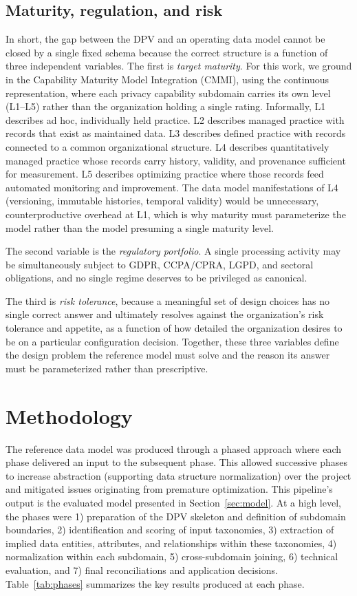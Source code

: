 \documentclass[10pt,letterpaper,twocolumn,twoside]{rho-class/rho}
\begin{document}
\subsection{Maturity, regulation, and risk}\label{sec:axes}

In short, the gap between the DPV and an operating data model cannot be closed by a single fixed schema because the correct structure is a function of three independent variables. The first is \emph{target maturity}. For this work, we ground in the Capability Maturity Model Integration (CMMI)\cite{cmmiinstitute}, using the continuous representation, where each privacy capability subdomain carries its own level (L1--L5) rather than the organization holding a single rating. Informally, L1 describes ad hoc, individually held practice. L2 describes managed practice with records that exist as maintained data. L3 describes defined practice with records connected to a common organizational structure. L4 describes quantitatively managed practice whose records carry history, validity, and provenance sufficient for measurement. L5 describes optimizing practice where those records feed automated monitoring and improvement. The data model manifestations of L4 (versioning, immutable histories, temporal validity) would be unnecessary, counterproductive overhead at L1, which is why maturity must parameterize the model rather than the model presuming a single maturity level.

The second variable is the \emph{regulatory portfolio}. A single processing activity may be simultaneously subject to GDPR, CCPA/CPRA, LGPD, and sectoral obligations, and no single regime deserves to be privileged as canonical. 

The third is \emph{risk tolerance}, because a meaningful set of design choices has no single correct answer and ultimately resolves against the organization's risk tolerance and appetite, as a function of how detailed the organization desires to be on a particular configuration decision. Together, these three variables define the design problem the reference model must solve and the reason its answer must be parameterized rather than prescriptive.

\section{Methodology}\label{sec:method}

The reference data model was produced through a phased approach where each phase delivered an input to the subsequent phase. This allowed successive phases to increase abstraction (supporting data structure normalization) over the project and mitigated issues originating from premature optimization. This pipeline's output is the evaluated model presented in Section~\ref{sec:model}. At a high level, the phases were 1) preparation of the DPV skeleton and definition of subdomain boundaries, 2) identification and scoring of input taxonomies, 3) extraction of implied data entities, attributes, and relationships within these taxonomies, 4) normalization within each subdomain, 5) cross-subdomain joining, 6) technical evaluation, and 7) final reconciliations and application decisions. Table~\ref{tab:phases} summarizes the key results produced at each phase.
\end{document}
